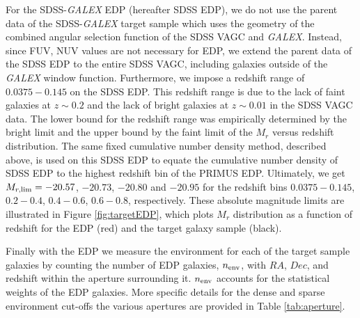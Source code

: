 \documentclass{emulateapj}
\begin{document}
For the SDSS-{\em GALEX} EDP (hereafter SDSS EDP), we do not use the parent data of 
the SDSS-{\em GALEX} target sample which uses the geometry of the combined angular selection function of the 
SDSS VAGC and {\em GALEX}. 
Instead, since FUV, NUV values are not necessary for EDP, we extend the parent data of the SDSS EDP
to the entire SDSS VAGC, including galaxies outside of the {\em GALEX} window function. 
Furthermore, we impose a redshift range of $0.0375-0.145$ on the SDSS EDP. 
This redshift range is due to the lack of faint galaxies at $z \sim 0.2$ and the lack of bright galaxies at 
$z \sim 0.01$ in the SDSS VAGC data.  
The lower bound for the redshift range was empirically determined by the bright limit and the upper bound 
by the faint limit of the $M_{r}$ versus redshift distribution. 
The same fixed cumulative number density method, described above, is used on this SDSS EDP to equate
the cumulative number density of SDSS EDP to the highest redshift bin of the PRIMUS EDP. 
Ultimately, we get $M_{r,\rm{lim}} = -20.57$, $-20.73$, $-20.80$ and $-20.95$ for the redshift bins $0.0375-0.145$, 
$0.2-0.4$, $0.4-0.6$, $0.6-0.8$, respectively.  %
These absolute magnitude limits are illustrated in Figure \ref{fig:targetEDP}, which plots $M_{r}$ distribution as 
a function of redshift for the EDP (red) and the target galaxy sample (black). 

Finally with the EDP we measure the environment for each of the target sample galaxies by counting the number
of EDP galaxies, $n_{\rm{env}}$, with $RA$, $Dec$, and redshift within the aperture surrounding it. 
$n_{\rm{env}}$ accounts for the statistical weights of the EDP galaxies. 
More specific details for the dense and sparse environment cut-offs the various apertures are provided in Table \ref{tab:aperture}.
\end{document}
